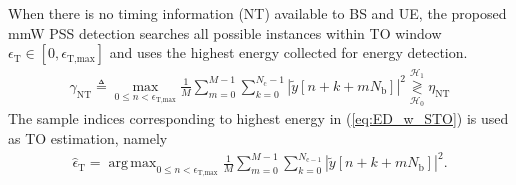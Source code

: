 \documentclass[journal]{IEEEtran}
\DeclareMathOperator*{\argmax}{arg\,max} %
\newcommand{\transpose}[0]{\text{T}}
\newcommand{\STO}[0]{\epsilon_{\text{T}}}
\newcommand{\Nc}[0]{N_{\text{c}}}
\begin{document}
When there is no timing information (NT) available to BS and UE, the proposed mmW PSS detection searches all possible instances within TO window $\STO \in [0,\epsilon_{\text{T,max}}]$ and uses the highest energy collected for energy detection. 
\begin{align}
\gamma_{\text{NT}} \triangleq \max_{0\leq n < \epsilon_{\text{T,max}}} \frac{1}{M}\sum_{m=0}^{M-1}\sum_{k=0}^{\Nc -1}\left|\tilde{y}[n+k+mN_{\text{b}}]\right|^2 \underset{\mathcal{H}_0}{\overset{\mathcal{H}_1}{\gtrless}}  \eta_{\text{NT}}
\label{eq:ED_w_STO}
\end{align}
The sample indices corresponding to highest energy in (\ref{eq:ED_w_STO}) is used as TO estimation, namely
\begin{align}
\hat{\epsilon}_{\text{T}} = \argmax_{0\leq n<\epsilon_{\text{T,max}}} \frac{1}{M}\sum_{m=0}^{M-1}\sum_{k=0}^{N_{\text{c}-1}}\left|\tilde{y}[n+k+mN_{\text{b}}]\right|^2.
\label{eq:timing_acquisition}
\end{align}




\end{document}
